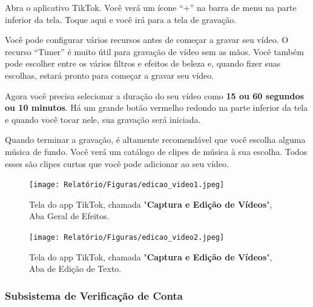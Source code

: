 Abra o aplicativo TikTok. Você verá um ícone “+” na barra de menu na parte inferior da tela. Toque aqui e você irá para a tela de gravação.\vskip0.3cm

Você pode configurar vários recursos antes de começar a gravar seu vídeo. O recurso “Timer” é muito útil para gravação de vídeo sem as mãos. Você também pode escolher entre os vários filtros e efeitos de beleza e, quando fizer suas escolhas, estará pronto para começar a gravar seu vídeo.\vskip0.3cm

Agora você precisa selecionar a duração do seu vídeo como\textbf{ 15 ou 60 segundos ou 10 minutos}. Há um grande botão vermelho redondo na parte inferior da tela e quando você tocar nele, sua gravação será iniciada.\vskip0.3cm

Quando terminar a gravação, é altamente recomendável que você escolha alguma música de fundo. Você verá um catálogo de clipes de música à sua escolha. Todos esses são clipes curtos que você pode adicionar ao seu vídeo.



\begin{figure}[H]
    \centering
    \begin{minipage}{0.35\textwidth}
        \centering
        \texttt{[image: Relatório/Figuras/edicao\_video1.jpeg]}
        \caption{Tela do app TikTok, chamada "\textbf{Captura e Edição de Vídeos}", Aba Geral de Efeitos.}
        \label{fig:promover_publicacao1}
    \end{minipage}\hfill
    \begin{minipage}{0.35\textwidth}
        \centering
        \texttt{[image: Relatório/Figuras/edicao\_video2.jpeg]}
        \caption{Tela do app TikTok, chamada "\textbf{Captura e Edição de Vídeos}", Aba de Edição de Texto.}
        \label{fig:promover_publicacao2}
    \end{minipage}
\end{figure}







\newpage
\subsubsection{Subsistema de Verificação de Conta}


